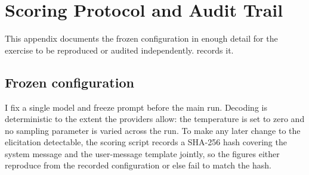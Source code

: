 \section{Scoring Protocol and Audit Trail}\label{app:protocol}

This appendix documents the frozen configuration in enough detail for the exercise to be reproduced or audited independently.  records it.

\subsection{Frozen configuration}

I fix a single model and freeze prompt before the main run. Decoding is deterministic to the extent the providers allow: the temperature is set to zero and no sampling parameter is varied across the run. To make any later change to the elicitation detectable, the scoring script records a SHA-256 hash covering the system message and the user-message template jointly, so the figures either reproduce from the recorded configuration or else fail to match the hash.

